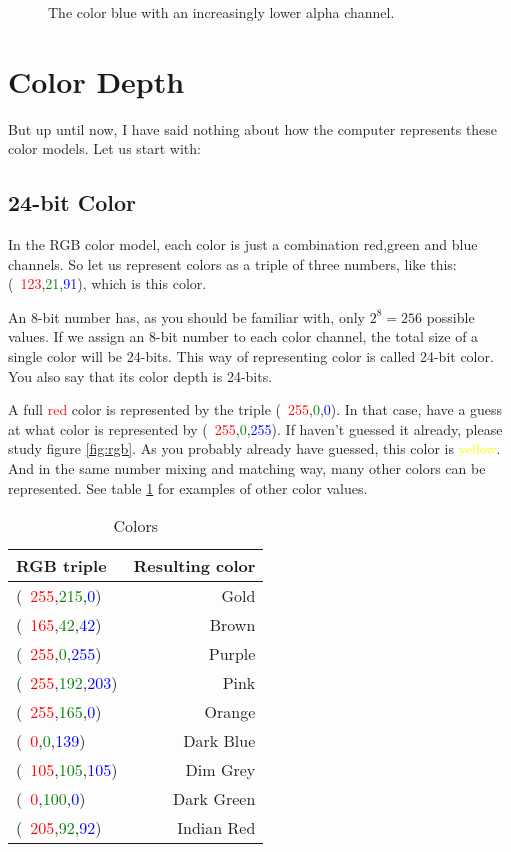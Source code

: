 \begin{refsection}
  \begin{figure}
    \centering
    \caption{The color blue with an increasingly lower alpha channel.}
    \label{fig:alpha}
  \end{figure}

  \section{Color Depth}
  \label{sec:color-depth}

  \newcommand{\rgbtrip}[3]{\mbox{( \textcolor{red}{#1},\textcolor{green}{#2},\textcolor{blue}{#3})}}

  But up until now, I have said nothing about how the computer
  represents these color models. Let us start with:

  \subsection{24-bit Color}
  \label{sec:24-bit-color}

  In the RGB color model, each color is just a combination red,green
  and blue channels. So let us represent colors as a triple of three
  numbers, like this: \rgbtrip{123}{21}{91}, which is
  \textcolor[RGB]{123,21,91}{this color}.

  An 8-bit number has, as you should be familiar with, only $2^8 =
  256$ possible values. If we assign an 8-bit number to each color
  channel, the total size of a single color will be 24-bits. This way
  of representing color is called 24-bit color. You also say that its color depth is 24-bits.

  \newcommand{\selfcolor}[1]{\textcolor{#1}{#1}}

  A full \selfcolor{red} color is represented by the triple \rgbtrip{255}{0}{0}. In
  that case, have a guess at what color is represented by
  \rgbtrip{255}{0}{255}. If haven't guessed it already, please study
  figure \ref{fig:rgb}. As you probably already have guessed, this color
  is \selfcolor{yellow}. And in the same number mixing and matching way, many other
  colors can be represented. See table \ref{tab:color-examples} for
  examples of other color values.

  \begin{table}
    \newcommand{\colorrow}[4]{  \rgbtrip{#1}{#2}{#3} &
      \textcolor[RGB]{#1,#2,#3}{#4} \\}
    \centering
    \begin{tabular}{lr}
      \toprule
      RGB triple & Resulting color \\
      \midrule
      \colorrow{255}{215}{0}{Gold}
      \colorrow{165}{42}{42}{Brown}
      \colorrow{255}{0}{255}{Purple}
      \colorrow{255}{192}{203}{Pink}
      \colorrow{255}{165}{0}{Orange}
      \colorrow{0}{0}{139}{Dark Blue}
      \colorrow{105}{105}{105}{Dim Grey}
      \colorrow{0}{100}{0}{Dark Green}
      \colorrow{205}{92}{92}{Indian Red}
      \bottomrule
    \end{tabular}
    \caption{Colors}
    \label{tab:color-examples}
  \end{table}


\end{refsection}
